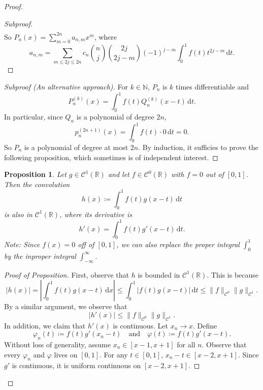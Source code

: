\documentclass[12pt]{article}
\theoremstyle{plain}
\newtheorem*{prop}{Proposition}
\theoremstyle{definition}
\begin{document}
\begin{proof}
\begin{description}
\begin{proof}[Subproof]
$$\begin{aligned}
            \end{aligned}$$
            So $P_n(x)=\sum_{m=0}^{2n}a_{n,m}x^m$, where
            $$a_{n,m}=\sum_{m\leq 2j\leq
            2n}c_n\binom{n}{j}\binom{2j}{2j-m}(-1)^{j-m}\int_0^1f(t)t^{2j-m}\,\mathrm{d}t.$$
        \end{proof}
        \begin{proof}[Subproof (An alternative approach)]
            For $k\in\mathbb{N}$, $P_n$ is $k$ times differentiable and
            $$P_n^{(k)}(x)=\int_0^1f(t)Q_n^{(k)}(x-t)\,\mathrm{d}t.$$
            In particular, since $Q_n$ is a polynomial of degree $2n$,
            $$p_n^{(2n+1)}(x)=\int_0^1f(t)\cdot 0\,\mathrm{d}t=0.$$
            So $P_n$ is a polynomial of degree at most $2n$.
            By induction, it sufficies to prove the following proposition, which
            sometimes is of independent interest.
        \end{proof}
        \begin{prop}
            Let $g\in\mathcal{C}^1(\mathbb{R})$ and let
            $f\in\mathcal{C}^0(\mathbb{R})$ with $f=0$ out of $[0,1]$.
            Then the convolution
            $$h(x)\coloneqq\int_0^1 f(t)g(x-t)\,\mathrm{d}t$$
            is also in $\mathcal{C}^1(\mathbb{R})$, where its derivative is 
            $$h'(x)=\int_0^1f(t)g'(x-t)\,\mathrm{d}t.$$
            Note: Since $f(x)=0$ off of $[0,1]$, we can also replace the proper
            integral $\int_0^1$ by the inproper integral $\int_{-\infty}^\infty$.
        \end{prop}
        \begin{proof}[Proof of Proposition]
            First, observe that $h$ is bounded in $\mathcal{C}^1(\mathbb{R})$.
            This is because
            $$|h(x)|=\left|\int_0^1f(t)g(x-t)\,\mathrm{d}x\right|\leq
            \int_0^1\left| f(t)g(x-t)\right| \,\mathrm{d}t
            \leq\|f\|_{\mathcal{C}^0}\|g\|_{\mathcal{C}^1}.$$
            By a similar argument, we observe that
            $$|h'(x)|\leq\|f\|_{\mathcal{C}^0}\|g\|_{\mathcal{C}^1}.$$
            In addition, we claim that $h'(x)$ is continuous.
            Let $x_n\rightarrow x$.  Define
            $$\varphi_n(t)\coloneqq f(t)g'(x_n-t)\quad\text{and}\quad
            \varphi(t)\coloneqq f(t)g'(x-t).$$
            Without loss of generality, assume $x_n\in[x-1,x+1]$ for all $n$.
            Observe that every $\varphi_n$ and $\varphi$ lives on $[0,1]$.
            For any $t\in[0,1]$, $x_n-t\in[x-2,x+1]$.
            Since $g'$ is continuous, it is uniform continuous on $[x-2,x+1]$.

\end{proof}
\end{description}
\end{proof}
\end{document}
